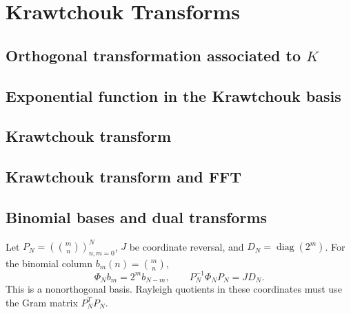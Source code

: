 \chapter{Krawtchouk Transforms}
\label{ch:14}
\section{Orthogonal transformation associated to $K$}
\label{sec:14-1}

\section{Exponential function in the Krawtchouk basis}
\label{sec:14-2}

\section{Krawtchouk transform}
\label{sec:14-3}

\section{Krawtchouk transform and FFT}
\label{sec:14-4}

\section{Binomial bases and dual transforms}
\label{sec:14-5}
Let $P_N=(\binom mn)_{n,m=0}^N$, $J$ be coordinate reversal, and $D_N=\operatorname{diag}(2^m)$. For the binomial column $b_m(n)=\binom mn$,
\[
\Phi_Nb_m=2^m b_{N-m},\qquad P_N^{-1}\Phi_NP_N=JD_N.
\]
This is a nonorthogonal basis. Rayleigh quotients in these coordinates must use the Gram matrix $P_N^TP_N$.

